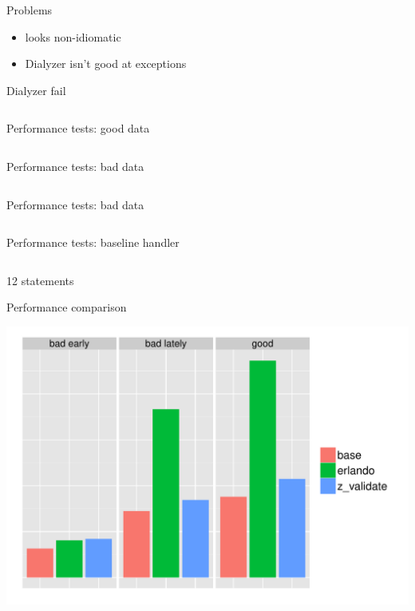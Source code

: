 \documentclass[10pt]{beamer}
\newcommand{\code}[4]{\inputminted[linenos, frame=none, firstline=#2, lastline=#3,
  framesep=10pt, bgcolor=lightgray]{#4}{#1}}
\begin{document}
\begin{frame}{Problems}
  \begin{itemize}
  \item looks non-idiomatic
  \item Dialyzer isn't good at exceptions
  \end{itemize}
\end{frame}

\begin{frame}{Dialyzer fail}
  \code{dialyzer_fail.erl}{4}{15}{erlang}
\end{frame}

\begin{frame}{Performance tests: good data}
  \code{code.erl}{185}{193}{erlang}
\end{frame}

\begin{frame}{Performance tests: bad data}
  \code{code.erl}{195}{202}{erlang}
\end{frame}

\begin{frame}{Performance tests: bad data}
  \code{code.erl}{204}{212}{erlang}
\end{frame}

\begin{frame}{Performance tests: baseline handler}
  \footnotesize
  \code{code.erl}{214}{230}{erlang}
  12 statements
\end{frame}

\begin{frame}{Performance comparison}
  \begin{center}
    \includegraphics[scale=0.55]{plot.pdf}
  \end{center}
\end{frame}
\end{document}
